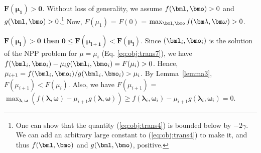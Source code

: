 $\bm{F(\mu_1) > 0}$. 
Without loss of generality, we assume $f(\bml, \bmo) > 0$ and $g(\bml, \bmo) > 0$.\footnote{One can show that the quantity (\ref{eq:obj:trans4})
is bounded below by $-2\gamma$. We can add an arbitrary large constant to (\ref{eq:obj:trans4}) to make it, and thus 
$f(\bml, \bmo)$ and $g(\bml, \bmo)$, positive.}
Now, $F(\mu_1)$ = $F(0)$ = $\max_{\bml, \bmo} f(\bm \lambda, \bm \omega) > 0$.

 $\bm{F(\mu_i) > 0}$ {\bf then} 
$\bm {0 \leq F(\mu_{i+1}) < F(\mu_i)}$.
Since $(\bml_i, \bmo_i)$ is the solution of the NPP problem for $\mu = \mu_i$ (Eq. \ref{eq:obj:trans7}),
we have $f(\bml_i, \bmo_i) - \mu_i g(\bml_i, \bmo_i) = F(\mu_i) > 0$.
Hence, $\mu_{i+1} = f(\bml_i, \bmo_i)/g(\bml_i, \bmo_i) > \mu_i$.
By Lemma~\ref{lemma3}, $F(\mu_{i+1}) < F(\mu_i)$.
Also, we have
$F(\mu_{i+1})$ = $\max_{\bm \lambda, \bm \omega} ( f(\bm \lambda, \bm \omega) -\mu_{i+1}g(\bm \lambda, \bm \omega))
\geq f(\bm \lambda_i, \bm \omega_i) - \mu_{i+1} g(\bm \lambda_i, \bm \omega_i) = 0$.

